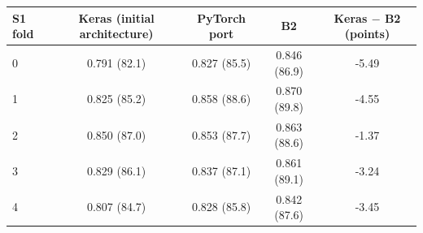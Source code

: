 \begin{tabular}{@{}lcccc@{}}
\toprule
S1 fold & Keras (initial architecture) & PyTorch port & B2 & Keras $-$ B2 (points) \\
\midrule
0 & 0.791 (82.1) & 0.827 (85.5) & 0.846 (86.9) & -5.49 \\ %
1 & 0.825 (85.2) & 0.858 (88.6) & 0.870 (89.8) & -4.55 \\ %
2 & 0.850 (87.0) & 0.853 (87.7) & 0.863 (88.6) & -1.37 \\ %
3 & 0.829 (86.1) & 0.837 (87.1) & 0.861 (89.1) & -3.24 \\ %
4 & 0.807 (84.7) & 0.828 (85.8) & 0.842 (87.6) & -3.45 \\ %
\bottomrule
\end{tabular}
